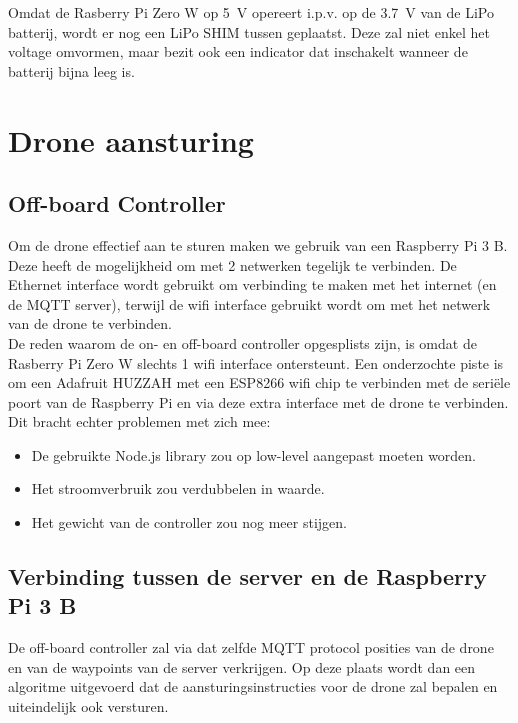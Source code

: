 Omdat de Rasberry Pi Zero W op \SI{5}{\V} opereert i.p.v. op de \SI{3.7}{\V} van de LiPo batterij, wordt er nog een LiPo SHIM tussen geplaatst. Deze zal niet enkel het voltage omvormen, maar bezit ook een indicator dat inschakelt wanneer de batterij bijna leeg is.

\section{Drone aansturing} \label{sec:drone_control}
\subsection{Off-board Controller} \label{sec:offboard_controller}
Om de drone effectief aan te sturen maken we gebruik van een Raspberry Pi 3 B.
Deze heeft de mogelijkheid om met 2 netwerken tegelijk te verbinden. De Ethernet interface wordt gebruikt om verbinding te maken met het internet (en de MQTT server), terwijl de wifi interface gebruikt wordt om met het netwerk van de drone te verbinden.\\

De reden waarom de on- en off-board controller opgesplists zijn, is omdat de Rasberry Pi Zero W slechts 1 wifi interface ontersteunt.
Een onderzochte piste is om een Adafruit HUZZAH met een ESP8266 wifi chip te verbinden met de seri\"ele poort van de Raspberry Pi en via deze extra interface met de drone te verbinden.\\
Dit bracht echter problemen met zich mee:
\begin{itemize}
	\item De gebruikte Node.js library zou op low-level aangepast moeten worden.
	\item Het stroomverbruik zou verdubbelen in waarde.
	\item Het gewicht van de controller zou nog meer stijgen.
\end{itemize}

\subsection{Verbinding tussen de server en de Raspberry Pi 3 B} \label{sec:server_raspberry}
De off-board controller zal via dat zelfde MQTT protocol posities van de drone en van de waypoints van de server verkrijgen.
Op deze plaats wordt dan een algoritme uitgevoerd dat de aansturingsinstructies voor de drone zal bepalen en uiteindelijk ook versturen.\\

